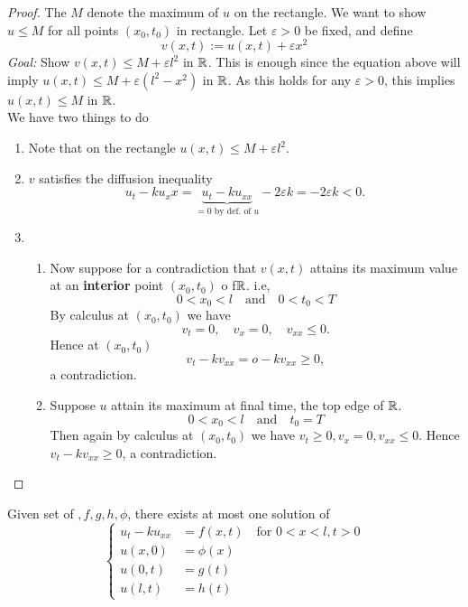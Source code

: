 \begin{proof}
	The $M$ denote the maximum of $u$ on the rectangle. We want to show $u \leq M$ for all points $(x_0,t_0)$ in rectangle. Let $\varepsilon > 0$ be fixed, and define 
	\[ v(x,t) := u(x,t) + \varepsilon x^2\]
	\textit{Goal:} Show $v(x,t) \leq M + \varepsilon l^2$ in $\mathbb R$. This is enough since the equation above will imply $u(x,t) \leq M + \varepsilon (l^2 - x^2)$ in $\mathbb R$. As this holds for any $\varepsilon > 0$, this implies $u(x,t) \leq M$ in $\mathbb R$. \\
	We have two things to do
	\begin{enumerate}
		\item Note that on the rectangle $u(x,t) \leq M + \varepsilon l^2$. 
		\item $v$ satisfies the diffusion inequality
		\[ u_t - ku_xx = \underbrace{u_t - ku_{xx}}_{ = 0 \,\, \text{by def. of } u} - 2 \varepsilon k = -2\varepsilon k < 0.\]
		\item \begin{enumerate}
			\item Now suppose for a contradiction that $v(x,t)$ attains its maximum value at an \textbf{interior} point $(x_0, t_0)$ o f$\mathbb R$. i.e,
			\[ 0 < x_0 < l \quad \mathrm{and} \quad 0 < t_0 < T\]
			By calculus at $(x_0, t_0)$ we have
			\[ v_t = 0, \quad v_x = 0, \quad v_{xx} \leq 0.\]
			Hence at $(x_0, t_0)$
			\[ v_t - kv_{xx} = o - kv_{xx} \geq 0,\]
			a contradiction.
			\item Suppose $u$ attain its maximum at final time, the top edge of $\mathbb R$. 
			\[ 0 < x_0 < l \quad \mathrm{and} \quad t_0 = T\]
			Then again by calculus at $(x_0, t_0)$ we have $v_t \geq 0, v_x = 0, v_{xx} \leq 0$. Hence $v_t - k v_{xx} \geq 0$, a contradiction.
		\end{enumerate}

	\end{enumerate}
\end{proof}
\begin{theorem}
	Given set of $,f,g,h, \phi$, there exists at most one solution of
	\[ \left\{ \begin{array}{rl} 
		u_t - k u_{xx} &= f(x,t) \quad \mathrm{for} \,\, 0 < x < l, t > 0 \\
		u(x,0) &= \phi(x)  \\
		u(0,t) &= g(t) \\
		u(l,t) &= h(t)
	\end{array} \right. \]
\end{theorem}
